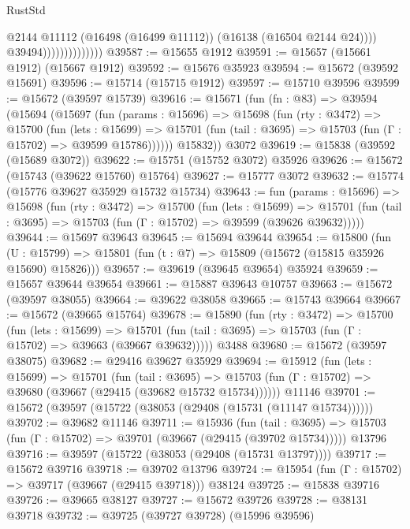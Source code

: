 \begin{lexlean}{RustStd}
\begin{coremodule}
                                    @2144
                                    @11112
                                    (@16498 (@16499 @11112))
                                    (@16138 (@16504 @2144 @24))))
                                @39494))))))))))))))
@39587 := @15655 @1912
@39591 := @15657 (@15661 @1912) (@15667 @1912)
@39592 := @15676 @35923
@39594 := @15672 (@39592 @15691)
@39596 := @15714 (@15715 @1912)
@39597 := @15710 @39596
@39599 := @15672 (@39597 @15739)
@39616 := @15671
    (fun (fn : @83) =>
    @39594
      (@15694
        (@15697
          (fun (params : @15696) =>
          @15698
            (fun (rty : @3472) =>
            @15700
              (fun (lets : @15699) =>
              @15701 (fun (tail : @3695) => @15703 (fun (Γ : @15702) => @39599 @15786))))))
        @15832))
    @3072
@39619 := @15838 (@39592 (@15689 @3072))
@39622 := @15751 (@15752 @3072) @35926
@39626 := @15672 (@15743 (@39622 @15760) @15764)
@39627 := @15777 @3072
@39632 := @15774 (@15776 @39627 @35929 @15732 @15734)
@39643 := fun (params : @15696) =>
  @15698
    (fun (rty : @3472) =>
    @15700
      (fun (lets : @15699) =>
      @15701 (fun (tail : @3695) => @15703 (fun (Γ : @15702) => @39599 (@39626 @39632)))))
@39644 := @15697 @39643
@39645 := @15694 @39644
@39654 := @15800
    (fun (U : @15799) => @15801 (fun (t : @7) => @15809 (@15672 (@15815 @35926 @15690) @15826)))
@39657 := @39619 (@39645 @39654) @35924
@39659 := @15657 @39644 @39654
@39661 := @15887 @39643 @10757
@39663 := @15672 (@39597 @38055)
@39664 := @39622 @38058
@39665 := @15743 @39664
@39667 := @15672 (@39665 @15764)
@39678 := @15890
    (fun (rty : @3472) =>
    @15700
      (fun (lets : @15699) =>
      @15701 (fun (tail : @3695) => @15703 (fun (Γ : @15702) => @39663 (@39667 @39632)))))
    @3488
@39680 := @15672 (@39597 @38075)
@39682 := @29416 @39627 @35929
@39694 := @15912
    (fun (lets : @15699) =>
    @15701
      (fun (tail : @3695) =>
      @15703 (fun (Γ : @15702) => @39680 (@39667 (@29415 (@39682 @15732 @15734))))))
    @11146
@39701 := @15672 (@39597 (@15722 (@38053 (@29408 (@15731 (@11147 @15734))))))
@39702 := @39682 @11146
@39711 := @15936
    (fun (tail : @3695) => @15703 (fun (Γ : @15702) => @39701 (@39667 (@29415 (@39702 @15734)))))
    @13796
@39716 := @39597 (@15722 (@38053 (@29408 (@15731 @13797))))
@39717 := @15672 @39716
@39718 := @39702 @13796
@39724 := @15954 (fun (Γ : @15702) => @39717 (@39667 (@29415 @39718))) @38124
@39725 := @15838 @39716
@39726 := @39665 @38127
@39727 := @15672 @39726
@39728 := @38131 @39718
@39732 := @39725 (@39727 @39728) (@15996 @39596)

\end{coremodule}
\end{lexlean}
